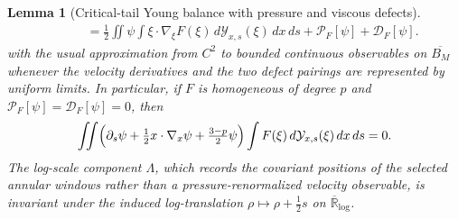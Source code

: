 \documentclass[11pt]{amsart}
\numberwithin{equation}{section}
\theoremstyle{plain}
\newtheorem{lemma}[lemma]{Lemma}
\theoremstyle{definition}
\theoremstyle{remark}
\begin{document}
\begin{lemma}[Critical-tail Young balance with pressure and viscous defects]
\begin{equation}
\begin{aligned}
   &\qquad =
   \frac12\iint \psi
   \int \xi\cdot\nabla_\xi F(\xi)\,d\mathcal Y_{x,s}(\xi)\,dx\,ds
   +\mathscr P_F[\psi]+\mathscr D_F[\psi].
\end{aligned}
\end{equation}
with the usual approximation from \(C^2\) to bounded continuous observables on
\(\overline{B_M}\) whenever the velocity derivatives and the two defect
pairings are represented by uniform limits.  In particular, if \(F\) is
homogeneous of degree \(p\) and
\(\mathscr P_F[\psi]=\mathscr D_F[\psi]=0\), then
\[
   \iint
   \Bigl(\partial_s\psi+\tfrac12x\cdot\nabla_x\psi
      +\tfrac{3-p}{2}\psi\Bigr)
   \int F(\xi)\,d\mathcal Y_{x,s}(\xi)\,dx\,ds=0 .
\]
The log-scale component \(\Lambda\), which records the covariant positions of
the selected annular windows rather than a pressure-renormalized velocity
observable, is invariant under the induced log-translation
\(\rho\mapsto\rho+\tfrac12 s\) on \(\overline{\mathbb R}_{\log}\).
\end{lemma}
\end{document}
